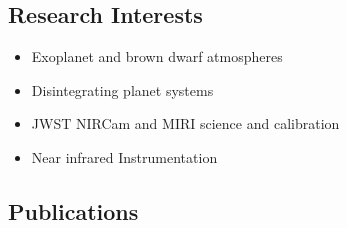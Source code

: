 \documentclass[11pt, oneside]{article}   	%
\begin{document}
\vspace{-0.2in}

\subsection*{Research Interests}
\begin{itemize}[noitemsep]
	\item Exoplanet and brown dwarf atmospheres
	\item Disintegrating planet systems
	\item JWST NIRCam and MIRI science and calibration
	\item Near infrared Instrumentation
\end{itemize}
\vspace{-0.2in}

\subsection*{Publications}

\nocite{rustamkulov2022nirspecPrism}

\nocite{ahrer2022WASP39bERS}
\nocite{ers2023wasp39b_CO2}
\nocite{schlawin2023SWNIRCamPerformance}
\nocite{glidic2022corot1}
\nocite{keles2022PEPSI_55cnc_e}
\nocite{su2022starSizedImpactClump}
\nocite{bruno2022starSpotCrossings}
\nocite{su2022satStarPhot}
\nocite{rieke2022IRAbsFlux1}
\nocite{schlawin2023eclipseMappingLongTermDrifts}
\nocite{baka2021peeringThroughDebris}
\nocite{schlawin2021halphaV1298Tauc}
\nocite{herter2020triplespec4}
\nocite{schlawin2021LBTk2-22}
\nocite{schlawin2020jwstNoiseFloor2}
\nocite{schlawin2020jwstNoiseFloorI}
\nocite{mansfield2020eigenspectra}
\nocite{bean2018ers}
\nocite{schlawin2018kic1255Normal}
\nocite{schlawin2018JWSTforecasts}
\nocite{schlawin2014}
\nocite{schlawin2017dhs}
\nocite{schlawin2017bdVar}
\nocite{greene2017jatisNIRCam}
\nocite{greene2016slitlessGrisms}
\nocite{schlawin2016kic1255}
\nocite{santerne2016ogle2011BLG-0417}
\nocite{stevenson2016ers}
\nocite{schlawin2015PhDthesis}
\nocite{schlawin2010}
\nocite{schlawin2016kic1255}
\nocite{schlawin2014TSpec}
\nocite{muirheadKOI961}
\nocite{dale2009spitzerAnthology}
\nocite{west2011sloanMdwarf}
\nocite{muirhead2012}
\nocite{johnson2012}
\nocite{muirheadKOI961}
\nocite{muirhead2014coolKOIIV}

\begingroup
\renewcommand{\section}[2]{}%


\endgroup
\end{document}
